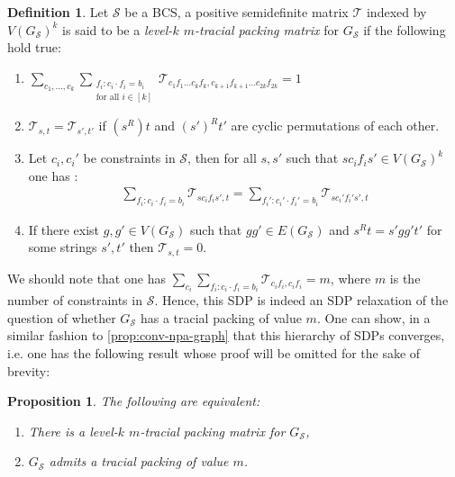 \documentclass[11pt,a4paper]{article}
\theoremstyle{plain}
\newtheorem{prop}[thm]{Proposition}
\theoremstyle{remark}
\theoremstyle{definition}
\newtheorem{definition}[thm]{Definition}
\def\calS{{\mathcal S}} \def\calT{{\mathcal T}} \def\calU{{\mathcal U}}
\begin{document}
\begin{definition}\label{def:tracial-packing-npa}
    Let $\calS$ be a BCS, a positive semidefinite matrix $\calT$ indexed by $V(G_{\calS})^{k}$ is said to be a \emph{level-$k$ $m$-tracial packing matrix} for $G_{\calS}$ if the following hold true: 
    \begin{enumerate}[label = (\roman*)]
         \item $\sum_{c_1, \dots , c_k} \sum_{\substack{f_i: c_i \cdot f_i = b_i \\ \text{for all } i \in [k]}}\calT_{c_1f_1\dots c_kf_k, c_{k+1}f_{k+1}\dots c_{2k}f_{2k}} = 1$
        \item $\calT_{s, t} = \calT_{s',t'}$ if $(s^R)t$ and $(s')^Rt'$ are cyclic permutations of each other.  
        \item Let $c_i, c_i'$ be constraints in $\calS$, then for all $s,s'$ such that $sc_if_is' \in V(G_{\calS})^{k}$ one has : 
        \begin{align*}
            \sum_{f_i: c_i\cdot f_i = b_i}\calT_{sc_if_is', t} = \sum_{f_i': c_i'\cdot f_i' = b_i}\calT_{sc_i'f_i's', t}
        \end{align*}
        \item If there exist $g,g' \in V(G_{\calS})$ such that $gg' \in E(G_{\calS})$ and $s^Rt = s'gg't'$ for some strings $s',t'$ then  $\calT_{s,t} = 0$.  
    \end{enumerate}
\end{definition}

We should note that one has $\sum_{c_i} \sum_{f_i: c_i \cdot f_i = b_i} \calT_{c_if_i, c_if_i} = m$, where $m$ is the number of constraints in $\calS$. Hence, this SDP is indeed an SDP relaxation of the question of whether $G_\calS$ has a tracial packing of value $m$. One can show, in a similar fashion to \cref{prop:conv-npa-graph} that this hierarchy of SDPs converges, i.e. one has the following result whose proof will be omitted for the sake of brevity: 

\begin{prop}
    The following are equivalent: 
    \begin{enumerate}[label = (\roman*)]
        \item There is a level-$k$ $m$-tracial packing matrix for $G_{\calS}$, 
        \item $G_{\calS}$ admits a tracial packing of value $m$.
    \end{enumerate}
\end{prop}
\end{document}
